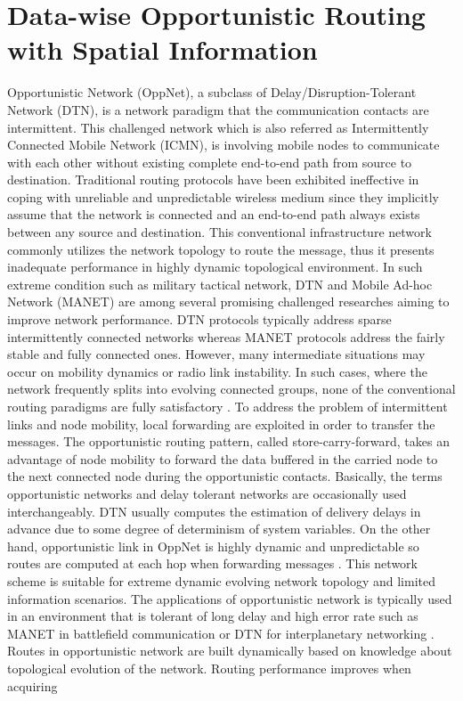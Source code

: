 \chapter{Data-wise Opportunistic Routing with Spatial Information}
\label{DORSI}

Opportunistic Network (OppNet), a subclass of Delay/Disruption-Tolerant Network (DTN), is a network paradigm that the communication contacts are intermittent. This challenged network which is also referred as Intermittently Connected Mobile Network (ICMN), is involving mobile nodes to communicate with each other without existing complete end-to-end path from source to destination. Traditional routing protocols have been exhibited ineffective in coping with unreliable and unpredictable wireless medium \cite{Yang2009} since they implicitly assume that the network is connected and an end-to-end path always exists between any source and destination. This conventional infrastructure network commonly utilizes the network topology to route the message, thus it presents inadequate performance in highly dynamic topological environment. In such extreme condition such as military tactical network, DTN and Mobile Ad-hoc Network (MANET) are among several promising challenged researches aiming to improve network performance. DTN protocols typically address sparse intermittently connected networks whereas MANET protocols address the fairly stable and fully connected ones. However, many intermediate situations may occur on mobility dynamics or radio link instability. In such cases, where the network frequently splits into evolving connected groups, none of the conventional routing paradigms are fully satisfactory \cite{Whitbeck2010}. To address the problem of intermittent links and node mobility, local forwarding are exploited in order to transfer the messages. The opportunistic routing pattern, called store-carry-forward, takes an advantage of node mobility to forward the data buffered in the carried node to the next connected node during the opportunistic contacts. Basically, the terms opportunistic networks and delay tolerant networks are occasionally used interchangeably. DTN usually computes the estimation of delivery delays in advance due to some degree of determinism of system variables. On the other hand, opportunistic link in OppNet is highly dynamic and unpredictable so routes are computed at each hop when forwarding messages \cite{Bujari2012a}. This network scheme is suitable for extreme dynamic evolving network topology and limited information scenarios. The applications of opportunistic network is typically used in an environment that is tolerant of long delay and high error rate such as MANET in battlefield communication \cite{Alspaugh2004} or DTN for interplanetary networking \cite{Jenkins2010}. Routes in opportunistic network are built dynamically based on knowledge about topological evolution of the network. Routing performance improves when acquiring
